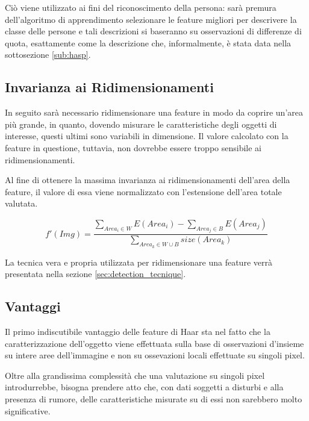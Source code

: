             Ciò viene utilizzato ai fini del riconoscimento della persona: sarà premura dell'algoritmo di apprendimento selezionare le feature migliori per descrivere la classe delle persone e tali descrizioni si baseranno su osservazioni di differenze di quota, esattamente come la descrizione che, informalmente, è stata data nella sottosezione \ref{sub:hasp}.

        \subsection{Invarianza ai Ridimensionamenti} %
        \label{sub:resize_invariance}
            In seguito sarà necessario ridimensionare una feature in modo da coprire un'area più grande, in quanto, dovendo misurare le caratteristiche degli oggetti di interesse, questi ultimi sono variabili in dimensione.
                Il valore calcolato con la feature in questione, tuttavia, non dovrebbe essere troppo sensibile ai ridimensionamenti.

                Al fine di ottenere la massima invarianza ai ridimensionamenti dell'area della feature, il valore di essa viene normalizzato con l'estensione dell'area totale valutata.

                \begin{equation}
                    f'(Img) = \frac
                    {\sum_{Area_i \in W}E(Area_i) - \sum_{Area_j \in B}E(Area_j)}
                    {\sum_{Area_k \in W \cup B}size(Area_k)}
                    \label{eq:haar_scale_invariant}
                \end{equation}

                La tecnica vera e propria utilizzata per ridimensionare una feature verrà presentata nella sezione \ref{sec:detection_tecnique}.

        \subsection{Vantaggi} %
        \label{sub:haar_feature_vantaggi}
            Il primo indiscutibile vantaggio delle feature di Haar sta nel fatto che la caratterizzazione dell'oggetto viene effettuata sulla base di osservazioni d'insieme su intere aree dell'immagine e non su ossevazioni locali effettuate su singoli pixel.

            Oltre alla grandissima complessità che una valutazione su singoli pixel introdurrebbe, bisogna prendere atto che, con dati soggetti a disturbi e alla presenza di rumore, delle caratteristiche misurate su di essi non sarebbero molto significative.

